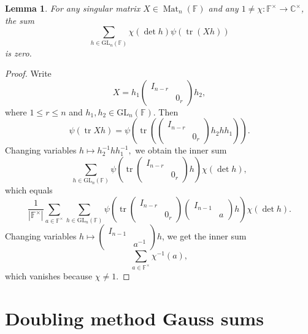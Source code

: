 \documentclass[12pt, reqno]{amsart}
\newtheorem{lemma}[theorem]{Lemma}
\theoremstyle{definition}
\theoremstyle{definition}
\theoremstyle{definition}
\newcommand{\cComplex}{\mathbb{C}}
\newcommand{\multiplicativegroup}[1]{#1^{\times}}
\newcommand{\sizeof}[1]{\left|#1\right|}
\newcommand{\fieldCharacter}{\psi}
\newcommand{\IdentityMatrix}[1]{I_{#1}}
\newcommand{\trace}{\operatorname{tr}}
\newcommand{\GL}{\mathrm{GL}}
\newcommand{\finiteField}{\mathbb{F}}
\newcommand{\squareMatrix}{\operatorname{Mat}}
\begin{document}
\begin{lemma}\label{lem:sum-vanishes-for-singular-matrices}
	For any singular matrix $X \in \squareMatrix_n\left(\finiteField\right)$ and any $1 \ne \chi \colon \multiplicativegroup{\finiteField} \to \multiplicativegroup{\cComplex}$, the sum
	$$\sum_{h \in \GL_n\left(\finiteField\right)} \chi\left(\det h\right) \fieldCharacter\left(\trace\left(Xh\right)\right)$$
	is zero.
\end{lemma}
\begin{proof}
	Write $$X = h_1 \begin{pmatrix}
		\IdentityMatrix{n-r}\\
		& 0_r
	\end{pmatrix} h_2,$$
	where $1 \le r \le n$ and $h_1, h_2 \in \GL_n\left(\finiteField\right)$. Then
	$$\fieldCharacter\left(\trace Xh\right) = \fieldCharacter\left(\trace\left( \begin{pmatrix}
		\IdentityMatrix{n-r}\\
		& 0_r
	\end{pmatrix} h_2 h h_1\right)\right).$$
	Changing variables $h \mapsto h_2^{-1} h h_1^{-1},$
	we obtain the inner sum
	$$\sum_{h \in \GL_n\left(\finiteField\right)} \fieldCharacter\left(\trace \begin{pmatrix}
		\IdentityMatrix{n-r}\\
		& 0_r
	\end{pmatrix} h \right) \chi\left(\det h\right),$$
	which equals
	$$\frac{1}{\sizeof{\multiplicativegroup{\finiteField}}} \sum_{a \in \multiplicativegroup{\finiteField}} \sum_{h \in \GL_n\left(\finiteField\right)} \fieldCharacter\left(\trace \begin{pmatrix}
		\IdentityMatrix{n-r}\\
		& 0_r
	\end{pmatrix} \begin{pmatrix}
		\IdentityMatrix{n-1}\\
		& a
	\end{pmatrix} h \right) \chi\left(\det h\right).$$
	Changing variables $h \mapsto \left(\begin{smallmatrix}
		\IdentityMatrix{n-1}\\
		& a^{-1}
	\end{smallmatrix}\right) h$, we get the inner sum $$\sum_{a \in \multiplicativegroup{\finiteField}} \chi^{-1}\left(a\right),$$
	which vanishes because $\chi \ne 1$.
\end{proof}

\section{Doubling method Gauss sums}
\end{document}
